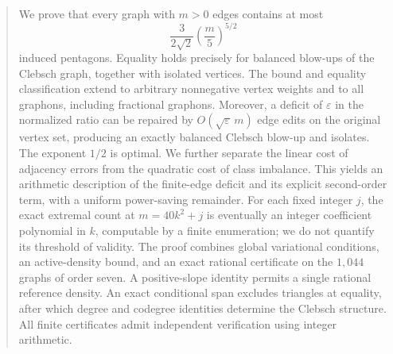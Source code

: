 \begin{abstract}
We prove that every graph with \(m>0\) edges contains at most
\[
 \frac{3}{2\sqrt{2}}\left(\frac{m}{5}\right)^{5/2}
\]
induced pentagons. Equality holds precisely for balanced blow-ups of the
Clebsch graph, together with isolated vertices. The bound and equality
classification extend to arbitrary nonnegative vertex weights and to all
graphons, including fractional graphons. Moreover, a deficit of
\(\varepsilon\) in the normalized ratio can be repaired by
\(O(\sqrt{\varepsilon}\,m)\) edge edits on the original vertex set,
producing an exactly balanced Clebsch blow-up and isolates. The exponent
\(1/2\) is optimal. We further separate the linear cost of adjacency errors
from the quadratic cost of class imbalance. This yields an arithmetic
description of the finite-edge deficit and its explicit second-order term,
with a uniform power-saving remainder. For each fixed integer \(j\), the
exact extremal count at \(m=40k^2+j\) is eventually an integer coefficient
polynomial in \(k\), computable by a finite enumeration; we do not quantify
its threshold of validity. The proof combines global variational conditions,
an active-density bound, and an exact rational certificate on the
\(1{,}044\) graphs of order seven. A positive-slope identity permits a
single rational reference density. An exact conditional span excludes
triangles at equality, after which degree and codegree identities determine
the Clebsch structure. All finite certificates admit independent
verification using integer arithmetic.
\end{abstract}
